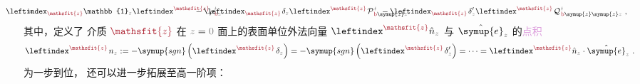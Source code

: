 \begin{subequations}
\begin{align}
	&= &&\hspace{-4.5em}\leftindex_{\textcolor{Maroon}{\mathsfit{z}}} {\mathbb{1}}_{\mathcolor{gray}{z}} \leftindex^{\textcolor{Maroon}{\mathsfit{z}}} {\rho}^{\;\!\mathcolor{gray}{t}}_{\;\!\textcolor{Maroon}{\text{b}}\mathcolor{gray}{z}} &&\hspace{-4.5em}- \leftindex_{\textcolor{Maroon}{\mathsfit{z}}} \;\! \delta_{\mathcolor{gray}{z}} \leftindex^{\textcolor{Maroon}{\mathsfit{z}}} \;\! {\mathcal{P}}^{\;\!\mathcolor{gray}{t}}_{\;\!\textcolor{Maroon}{\text{b}} \symup{z} \mathcolor{gray}{z}} &&\hspace{-4.5em}- \leftindex_{\textcolor{Maroon}{\mathsfit{z}}} \;\! \delta'_{\mathcolor{gray}{z}} \leftindex^{\textcolor{Maroon}{\mathsfit{z}}} \;\! {\mathcal{Q}}^{\;\!\mathcolor{gray}{t}}_{\;\!\textcolor{Maroon}{\text{b}} \symup{z} \symup{z} \mathcolor{gray}{z}} ~, \label{eq:p-b-01}
\end{align}
\end{subequations}
其中，定义了 介质 $\textcolor{Maroon}{\mathsfit{z}}$ 在 $\mathcolor{gray}{z} = \mathcolor{gray}{0}$ 面上的表面单位外法向量 $\leftindex^{\textcolor{Maroon}{\mathsfit{z}}} {\hat{n}}_{\mathcolor{gray}{z}}$ 与 $\hat{\symup{e}}_{\mathcolor{gray}{z}}$ 的\textcolor{Plum}{点积}
\begin{align} \label{eq:surf-normal-dot}
	\leftindex^{\textcolor{Maroon}{\mathsfit{z}}} \;\! n_{\mathcolor{gray}{z}} := - \symup{sgn} \left( \leftindex^{\textcolor{Maroon}{\mathsfit{z}}} \;\! \delta_{\mathcolor{gray}{z}} \right) = - \symup{sgn} \left( \leftindex^{\textcolor{Maroon}{\mathsfit{z}}} \;\! \delta'_{\mathcolor{gray}{z}} \right) = \cdots = \leftindex^{\textcolor{Maroon}{\mathsfit{z}}} {\hat{n}}_{\mathcolor{gray}{z}} \cdot \hat{\symup{e}}_{\mathcolor{gray}{z}}~.
\end{align}
为一步到位， 还可以进一步拓展至高一阶项：
